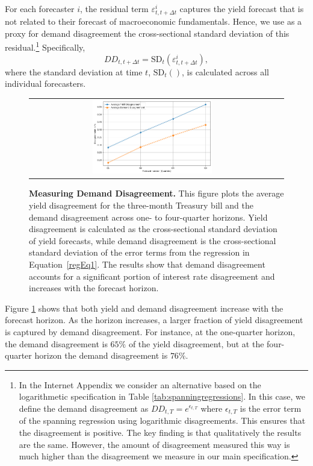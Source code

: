 \documentclass[preprint,11pt,authoryear]{elsarticle}
\theoremstyle{plain}
\begin{document}
For each forecaster $i$, the residual term $\varepsilon^i_{t,t+\Delta t}$ captures the yield forecast that is not related to their forecast of macroeconomic fundamentals. Hence, we use as a proxy for demand disagreement the cross-sectional standard deviation of this residual.\footnote{In the Internet Appendix we consider an alternative based on the logarithmetic  specification in Table \ref{tab:spanningregressions}. In this case, we define the demand disagreement as $DD_{t,T} = e^{\epsilon_{t,T}}$ where $\epsilon_{t,T}$ is the error term of the spanning regression using logarithmic disagreements. This ensures that the disagreement is positive. The key finding is that qualitatively the results are the same. However, the amount of disagreement measured this way is much higher than the disagreement we measure in our main specification.} Specifically, 
\begin{equation}\label{DD}
    DD_{t,t+ \Delta t} = \text{SD}_t \left(\varepsilon^i_{t,t+\Delta t} \right),
\end{equation}
where the standard deviation at time $t$, $\text{SD}_t\left(\right)$, is calculated across all individual forecasters. 

\begin{figure}[htbp]
\centering
\vspace{0.1in}
\begin{tabular}{cc}
\includegraphics[width=0.5\textwidth]{figures/DemandDisagreementFigIntro.png} &
\end{tabular}
\caption{\textbf{Measuring Demand Disagreement.} This figure plots the average yield disagreement for the three-month Treasury bill and the demand disagreement across one- to four-quarter horizons. Yield disagreement is calculated as the cross-sectional standard deviation of yield forecasts, while demand disagreement is the cross-sectional standard deviation of the error terms from the regression in Equation~\eqref{regEq1}. The results show that demand disagreement accounts for a significant portion of interest rate disagreement and increases with the forecast horizon.}  \label{fig:DemandDisagreementMotivating}
\end{figure}
Figure \ref{fig:DemandDisagreementMotivating} shows that both yield and demand disagreement increase with the forecast horizon. As the horizon increases, a larger fraction of yield disagreement is captured by demand disagreement. For instance, at the one-quarter horizon, the demand disagreement is $65\%$ of the yield disagreement, but at the four-quarter horizon the demand disagreement is $76\%$. 
\end{document}
